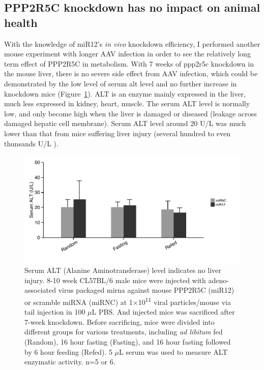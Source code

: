 \subsection{PPP2R5C knockdown has no impact on animal health}

With the knowledge of miR12's \textit{in vivo} knockdown efficiency, I performed another mouse experiment with longer AAV infection in order to see the relatively long term effect of PPP2R5C in metabolism. With 7 weeks of \gls{ppp2r5c} knockdown in the mouse liver, there is no severe side effect from \gls{AAV} infection, which could be demonstrated by the low level of serum \gls{alt} level and no further increase in knockdown mice (Figure~\ref{fig:fig2.21}). ALT is an enzyme mainly expressed in the liver, much less expressed in kidney, heart, muscle. The serum ALT level is normally low, and only become high when the liver is damaged or diseased (leakage across damaged hepatic cell membrane). Serum ALT level around 20 U/L was much lower than that from mice suffering liver injury (several hundred to even thunsands U/L \cite{masaki_role_2005}). 

\begin{figure}[htbp]
\centering
\includegraphics[width=1\textwidth]{figs/fig2-21 serum ALT.pdf}
\caption[Serum ALT after PPP2R5C KD]{\footnotesize Serum ALT (Alanine Aminotransferase) level indicates no liver injury. 8-10 week CL57BL/6 male mice were injected with adeno-associated virus packaged \gls{mirna} against mouse PPP2R5C (miR12) or scramble miRNA (miRNC) at 1$\times$10\textsuperscript{11} viral particles/mouse via tail injection in 100 $\mu$L PBS. And injected mice was sacrificed after 7-week knockdown. Before sacrificing, mice were divided into different groups for various treatments, including \textit{ad libitum} fed (Random), 16 hour fasting (Fasting), and 16 hour fasting followed by 6 hour feeding (Refed). 5 $\mu$L serum was used to measure ALT enzymatic activity. n=5 or 6.}
\label{fig:fig2.21}
\end{figure}

